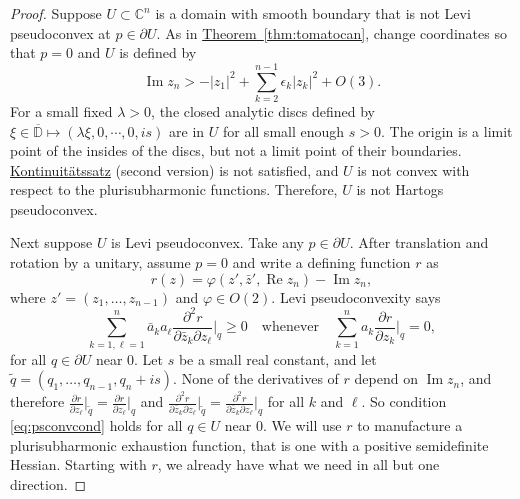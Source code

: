 \documentclass[12pt,openany]{book}
\renewcommand{\Re}{\operatorname{Re}}
\renewcommand{\Im}{\operatorname{Im}}
\newcommand{\sabs}[1]{\lvert {#1} \rvert}
\newcommand{\C}{{\mathbb{C}}}
\newcommand{\D}{{\mathbb{D}}}
\theoremstyle{plain}
\theoremstyle{remark}
\theoremstyle{definition}
\theoremstyle{exercise}
\theoremstyle{example}
\newcommand{\thmref}[1]{\hyperref[#1]{Theorem~\ref*{#1}}}
\begin{document}
\begin{proof}
Suppose
$U \subset \C^n$ is a domain with smooth boundary that is not
Levi pseudoconvex at $p \in \partial U$.
As in
\thmref{thm:tomatocan}, change coordinates so that $p=0$ and $U$ is defined
by
\begin{equation*}
\Im z_n > - \sabs{z_1}^2 + \sum_{k=2}^{n-1} \epsilon_k \sabs{z_k}^2 + O(3) .
\end{equation*}
For a small fixed $\lambda > 0$, the
closed analytic discs defined by $\xi \in \overline{\D} \mapsto (\lambda \xi, 0, \cdots, 0, is)$
are in $U$ for all small enough $s > 0$.  The origin
is a limit point of the insides of the discs, but not a limit point of their boundaries.
\hyperref[thm:contprinciple2]{Kontinuit\"atssatz} (second version) is not satisfied,
and $U$ is not
convex with respect to the plurisubharmonic functions.  Therefore,
$U$ is not Hartogs pseudoconvex.

Next suppose $U$ is Levi pseudoconvex.  Take any $p \in \partial U$.
After translation and rotation by a unitary, assume $p=0$ and
write a defining function $r$ as
\begin{equation*}
r(z) = \varphi(z',\bar{z}',\Re z_n) - \Im z_n ,
\end{equation*}
where $z' = (z_1,\ldots,z_{n-1})$ and $\varphi \in O(2)$.
Levi pseudoconvexity says
\begin{equation} \label{eq:psconvcond}
\sum_{k=1,\ell=1}^n
\bar{a}_k a_\ell \frac{\partial^2 r}{\partial \bar{z}_k \partial z_\ell} \Big|_q \geq 0
\quad \text{whenever} \quad
\sum_{k=1}^n
a_k \frac{\partial r}{\partial z_k} \Big|_q = 0 ,
\end{equation}
for all $q \in \partial U$ near $0$.
Let $s$ be a small real constant,
and let $\widetilde{q} = (q_1,\ldots,q_{n-1},q_n + is)$.
None of the derivatives of $r$ depend on $\Im z_n$, and therefore
$\frac{\partial r}{\partial z_\ell} \big|_{\widetilde{q}} =
\frac{\partial r}{\partial z_\ell} \big|_{q}$ and
$\frac{\partial^2 r}{\partial \bar{z}_k \partial z_\ell} \big|_{\widetilde{q}} =
\frac{\partial^2 r}{\partial \bar{z}_k \partial z_\ell} \big|_{q}$
for all $k$ and $\ell$.
So condition \eqref{eq:psconvcond} holds for all $q \in U$ near $0$.
We will use $r$ to manufacture a plurisubharmonic exhaustion function, that
is one with a positive semidefinite Hessian.
Starting with $r$, we already
have what we need in all but one direction.


\end{proof}
\end{document}
